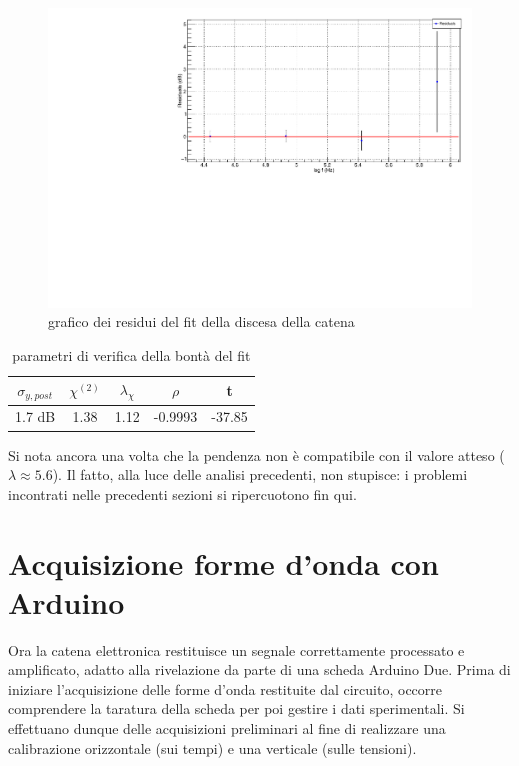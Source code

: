 \documentclass{article}
\begin{document}
\begin{center}
    \begin{figure}[H]
    \centering
    \includegraphics[scale=0.375, angle=0]{residuicatenadiscesa.pdf}
    \caption{grafico dei residui del fit della discesa della catena}
    \label{fig:residuicatenadiscesa}
    \end{figure}
\end{center}

\begin{table}[ht]
    \centering
    \begin{tabular}{ccccc}
        \toprule
        $\sigma_{y, post}$    &$\chi^{(2)}$    &$\lambda_{\chi}$   &$\rho$  &t   \\
        \midrule
        1.7 dB                &1.38           &1.12              &-0.9993&-37.85\\
        \bottomrule
    \end{tabular}
    \caption{parametri di verifica della bontà del fit}
\end{table}

Si nota ancora una volta che la pendenza non è compatibile con il valore atteso ($\lambda \approx 5.6$). Il fatto, alla luce delle analisi precedenti,
non stupisce: i problemi incontrati nelle precedenti sezioni si ripercuotono fin qui.

\section{Acquisizione forme d'onda con Arduino}

Ora la catena elettronica restituisce un segnale correttamente processato e amplificato, adatto alla rivelazione da parte di una scheda Arduino Due. Prima di iniziare
l'acquisizione delle forme d'onda restituite dal circuito, occorre comprendere la taratura della scheda per poi gestire i dati sperimentali. Si effettuano dunque delle 
acquisizioni preliminari al fine di realizzare una calibrazione orizzontale (sui tempi) e una verticale (sulle tensioni).
\end{document}
